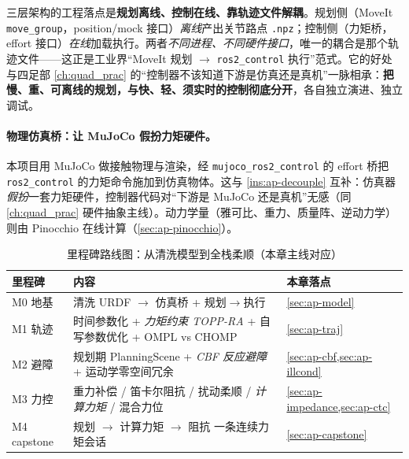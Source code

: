 \begin{insight}\label{ins:ap-decouple}
三层架构的工程落点是\textbf{规划离线、控制在线、靠轨迹文件解耦}。规划侧（MoveIt \texttt{move\_group}，position/mock 接口）\emph{离线}产出关节路点 \texttt{.npz}；控制侧（力矩桥，effort 接口）\emph{在线}加载执行。两者\emph{不同进程、不同硬件接口}，唯一的耦合是那个轨迹文件——这正是工业界“MoveIt 规划 $\to$ \texttt{ros2\_control} 执行”范式。它的好处与四足部 \cref{ch:quad_prac} 的“控制器不该知道下游是仿真还是真机”一脉相承：\textbf{把慢、重、可离线的规划，与快、轻、须实时的控制彻底分开}，各自独立演进、独立调试。
\end{insight}

\paragraph{物理仿真桥：让 MuJoCo 假扮力矩硬件。}
本项目用 MuJoCo\cite{todorov2012mujoco} 做接触物理与渲染，经 \texttt{mujoco\_ros2\_control} 的 effort 桥把 \texttt{ros2\_control} 的力矩命令施加到仿真物体。这与 \cref{ins:ap-decouple} 互补：仿真器\emph{假扮}一套力矩硬件，控制器代码对“下游是 MuJoCo 还是真机”无感（同 \cref{ch:quad_prac} 硬件抽象主线）。动力学量（雅可比、重力、质量阵、逆动力学）则由 Pinocchio 在线计算（\cref{sec:ap-pinocchio}）。

\begin{table}[H]\centering\small
\caption{里程碑路线图：从清洗模型到全栈柔顺（本章主线对应）}
\begin{tabular}{p{} p{} p{}}
\toprule
里程碑 & 内容 & 本章落点 \\
\midrule
M0 地基 & 清洗 URDF $\to$ 仿真桥 + 规划$\to$执行 & \cref{sec:ap-model} \\
M1 轨迹 & 时间参数化 + \emph{力矩约束 TOPP-RA} + 自写参数优化 + OMPL vs CHOMP & \cref{sec:ap-traj} \\
M2 避障 & 规划期 PlanningScene + \emph{CBF 反应避障} + 运动学零空间冗余 & \cref{sec:ap-cbf,sec:ap-illcond} \\
M3 力控 & 重力补偿 / 笛卡尔阻抗 / 扰动柔顺 / \emph{计算力矩} / 混合力位 & \cref{sec:ap-impedance,sec:ap-ctc} \\
M4 capstone & 规划 $\to$ 计算力矩 $\to$ 阻抗 一条连续力矩会话 & \cref{sec:ap-capstone} \\
\bottomrule
\end{tabular}
\label{tab:ap-milestones}
\end{table}

